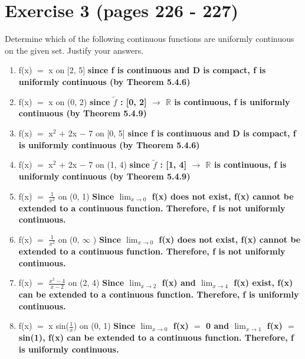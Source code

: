 \documentclass{article}
\newcommand{\mt}[1]{\ensuremath{#1}}
\newcommand\bsc[2][\DefaultOpt]{%
  \def\DefaultOpt{#2}%
  \section[#1]{#2}%
}
\newcommand{\balist}{\begin{enumerate}[label=\alph*.]}
\newcommand{\elist}{\end{enumerate}}
\newcommand{\br}{\mt{\mathbb{R}} }       %
\newcommand{\lra}{ \mt{\longrightarrow} } %
\newcommand{\ps}{\mt{+} }
\newcommand{\ms}{\mt{-} }
\newcommand{\eql}{\mt{=} }
\newcommand{\uf}[2]{#1\mt{^{#2}}}
\newcommand{\frc}[2]{\mt{\frac{#1}{#2}}}
\newcommand{\limt}[2]{\mt{\displaystyle{\lim_{#1 \to #2}}}}
\newcommand{\infy}{\mt{\infty} }
\newcommand{\wit}[1]{\mt{\widetilde{#1}}}
\begin{document}
\newpage

\bsc{Exercise 3 (pages 226 - 227)}{

Determine which of the following continuous functions are uniformly continuous on the given set. Justify your answers.

\balist
\item f(x) \eql x on [2, 5] \textbf{since f is continuous and D is compact, f is uniformly continuous (by Theorem 5.4.6)}
\item f(x) \eql x on (0, 2) \textbf{since \wit{f} : [0, 2] \lra \br is continuous, f is uniformly continuous (by Theorem 5.4.9)}
\item f(x) \eql \uf{x}{2} \ps 2x \ms 7 on [0, 5] \textbf{since f is continuous and D is compact, f is uniformly continuous (by Theorem 5.4.6)}
\item f(x) \eql \uf{x}{2} \ps 2x \ms 7 on (1, 4) \textbf{since \wit{f} : [1, 4] \lra \br is continuous, f is uniformly continuous (by Theorem 5.4.9)}
\item f(x) \eql \frc{1}{x^2} on (0, 1) \textbf{Since \limt{x}{0} f(x) does not exist, f(x) cannot be extended to a continuous function. Therefore, f is not uniformly continuous.}
\item f(x) \eql \frc{1}{x^2} on (0, \infy) \textbf{Since \limt{x}{0} f(x) does not exist, f(x) cannot be extended to a continuous function. Therefore, f is not uniformly continuous.}
\item f(x) \eql \frc{x^2 - 4}{x - 2} on (2, 4) \textbf{Since \limt{x}{2} f(x) and \limt{x}{4} f(x) exist, f(x) can be extended to a continuous function. Therefore, f is uniformly continuous.}
\item f(x) \eql x sin(\frc{1}{x}) on (0, 1) \textbf{Since \limt{x}{0} f(x) \eql 0 and \limt{x}{1} f(x) \eql sin(1), f(x) can be extended to a continuous function. Therefore, f is uniformly continuous.}
\elist

}
\end{document}
